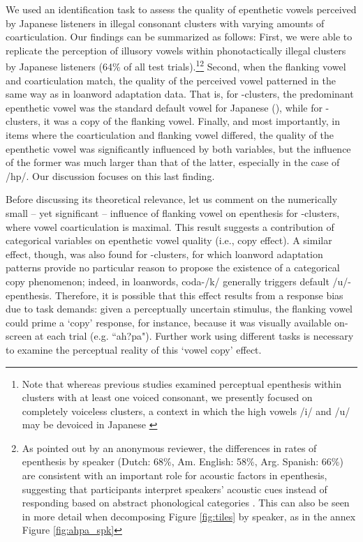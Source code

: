 We used an identification task to assess the quality of epenthetic vowels perceived by Japanese listeners in illegal consonant clusters with varying amounts of coarticulation. Our findings can be summarized as follows: First, we were able to replicate the perception of illusory vowels within phonotactically illegal clusters by Japanese listeners (64\% of all test trials).\footnote{Note that whereas previous studies examined perceptual epenthesis within clusters with at least one voiced consonant, we presently focused on completely voiceless clusters, a context in which the high vowels /i/ and /u/ may be devoiced in Japanese \cite{han1962, vance1987}}\footnote{As pointed out by an anonymous reviewer, the differences in rates of epenthesis by speaker (Dutch: 68\%, Am. English: 58\%, Arg. Spanish: 66\%) are consistent with an important role for acoustic factors in epenthesis, suggesting that participants interpret speakers' acoustic cues instead of responding based on abstract phonological categories {\color{red}\cite[cf.][]{wilson2014}}. This can also be seen in more detail when decomposing Figure \ref{fig:tiles} by speaker, as in the annex Figure \ref{fig:ahpa_spk}} %
Second, when the flanking vowel and coarticulation match, the quality of the perceived vowel patterned in the same way as in loanword adaptation data. That is, for -clusters, the predominant epenthetic vowel was the standard default vowel for Japanese (), while for -clusters, it was a copy of the flanking vowel. Finally, and most importantly, in items where the coarticulation and flanking vowel differed, the quality of the epenthetic vowel was significantly influenced by both variables, but the influence of the former was much larger than that of the latter, especially in the case of /hp/. Our discussion focuses on this last finding. 

Before discussing its theoretical relevance, let us comment on the numerically small -- yet significant -- influence of flanking vowel on epenthesis for -clusters, where vowel coarticulation is maximal. This result suggests a contribution of categorical variables on epenthetic vowel quality (i.e., copy effect). A similar effect, though, was also found for -clusters, for which loanword adaptation patterns provide no particular reason to propose the existence of a categorical copy phenomenon; indeed, in loanwords, coda-/k/ generally triggers default /u/-epenthesis. 
Therefore, it is possible that this effect results from a response bias due to task demands: given a perceptually uncertain stimulus, the flanking vowel could prime a `copy' response, for instance, because it was visually available on-screen at each trial (e.g. ``ah?pa"). Further work using different tasks is necessary to examine the perceptual reality of this `vowel copy' effect.


